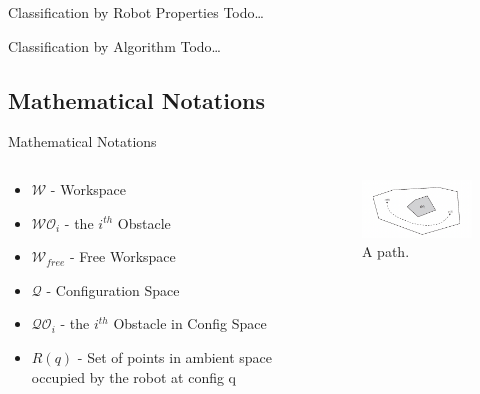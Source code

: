 \documentclass{beamer}
\begin{document}
  \begin{frame}{Classification by Robot Properties}
    Todo\dots
  \end{frame}

  \begin{frame}{Classification by Algorithm}
    Todo\dots
  \end{frame}

\subsection[Notations]{Mathematical Notations}

\begin{frame}{Mathematical Notations}
  
  \begin{columns}
    \begin{column}{0.5\textwidth}
      \begin{itemize}
        \item $\mathcal{W}$  - Workspace \pause
        \item $\mathcal{W} \mathcal{O}_{i} $ - the $i^{th}$ Obstacle \pause
        \item $\mathcal{W}_{free}$ - Free Workspace \pause
        \item $\mathcal{Q}$ - Configuration Space \pause
        \item $\mathcal{Q} \mathcal{O}_{i} $ - the $i^{th}$ Obstacle in Config Space \pause
        \item $R(q)$ - Set of points in ambient space occupied by the robot at config q
        \end{itemize}
    \end{column}
    \begin{column}{0.5\textwidth}  %
        \begin{center}
          \begin{figure}
            \includegraphics[width=60mm]{fig/fig_01.png}
            \caption{A path.}
            \label{fig:fig01}
          \end{figure}
         \end{center}
    \end{column}
    \end{columns}
\end{frame}
\end{document}
